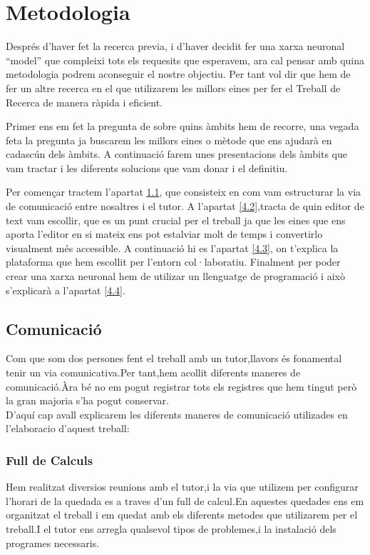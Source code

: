 \chapter{Metodologia}
Després d'haver fet la recerca previa, i d'haver decidit fer una xarxa neuronal ``model'' que compleixi tots els requesits que esperavem, ara cal pensar amb quina metodologia podrem aconseguir el nostre objectiu. Per tant vol dir que hem de fer un altre recerca en el que utilizarem les millors eines per fer el Treball de Recerca de manera ràpida i eficient.


Primer ens em fet la pregunta de  sobre quins àmbits hem de recorre, una vegada feta la pregunta ja buscarem les millors eines o mètode que ens ajudarà en cadascún dels àmbits. A continuació farem unes presentacions dels àmbits que vam tractar i les diferents solucions que vam donar i el definitiu.

Per començar tractem  l'apartat \ref{4.1}, que consisteix en com vam estructurar la via de comunicació entre nosaltres i el tutor. A l'apartat \ref{4.2},tracta de quin editor de text vam escollir, que es un punt crucial per el treball ja que les eines que ens aporta l'editor en si mateix ens pot estalviar molt de temps i convertirlo visualment més accessible. A continuació hi es l'apartat \ref{4.3}, on t'explica la plataforma que hem escollit per l'entorn col·laboratiu. Finalment per poder crear una xarxa neuronal hem de utilizar un llenguatge de programació i això s'explicarà a l'apartat \ref{4.4}.



\section{Comunicació}\label{4.1}
Com que som dos persones fent el treball amb un tutor,llavors és fonamental tenir un via comunicativa.Per tant,hem acollit diferents maneres de comunicació.Àra bé no em pogut registrar tots els registres que hem tingut però la gran majoria s'ha pogut conservar.\\
D'aquí cap avall explicarem les diferents maneres de comunicació utilizades en l'elaboracio d'aquest treball:\\
\subsection{Full de Calculs}
Hem realitzat diversios reunions amb el tutor,i la via que utilizem per configurar l'horari de la quedada es a traves d'un full de calcul.En aquestes quedades ens em  organitzat el treball i em quedat amb els diferents metodes que utilizarem per el treball.I el tutor ens arregla qualsevol tipos de problemes,i la instalació dels programes necessaris.
